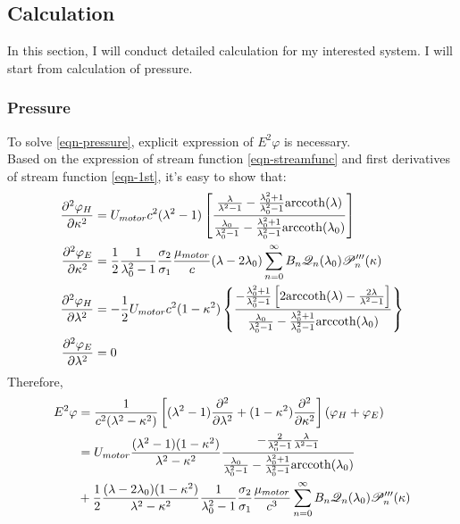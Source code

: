 \documentclass[fontsize=11pt, %
                             paper=a4, %
                             twoside, %
                             captions=tableheading,
                             index=totoc,
                             hyperref]{labbook}
\begin{document}
\begin{addmargin}[4cm]{0cm}
\subsection{Calculation}
In this section, I will conduct detailed calculation for my interested system. I will start from calculation of pressure.
\subsubsection{Pressure}
To solve \ref{eqn-pressure}, explicit expression of $E^2 \varphi$ is necessary.\\
Based on the expression of stream function \ref{eqn-streamfunc} and first derivatives of stream function \ref{eqn-1st}, it's easy to show that:
\begin{equation}
\begin{aligned}
\frac{\partial^2 \varphi_H}{\partial \kappa^2}&=U_{motor}c^2(\lambda^2-1)\left[\frac{\frac{\lambda}{\lambda^2-1}-\frac{\lambda_0^2+1}{\lambda^2_0-1}\mathrm{arccoth}(\lambda)}{\frac{\lambda_0}{\lambda_0^2-1}-\frac{\lambda_0^2+1}{\lambda_0^2-1}\mathrm{arccoth}(\lambda_0)}\right]\\
\frac{\partial^2 \varphi_E}{\partial \kappa^2}&=\frac{1}{2}\frac{1}{\lambda_0^2-1}\frac{\sigma_2}{\sigma_1}\frac{\mu_{motor}}{c}(\lambda-2\lambda_0)\sum_{n=0}^\infty B_n \mathscr{Q}_n(\lambda_0)\mathscr{P}_n^{\prime\prime\prime}(\kappa)\\
\frac{\partial^2 \varphi_H}{\partial \lambda^2}&=-\frac{1}{2}U_{motor}c^2(1-\kappa^2)\left\{\frac{-\frac{\lambda_0^2+1}{\lambda_0^2-1}\left[2\mathrm{arccoth}(\lambda)-\frac{2\lambda}{\lambda^2-1}\right]}{\frac{\lambda_0}{\lambda_0^2-1}-\frac{\lambda_0^2+1}{\lambda_0^2-1}\mathrm{arccoth}(\lambda_0)}\right\}\\
\frac{\partial^2 \varphi_E}{\partial \lambda^2}&=0
\end{aligned}
\end{equation}
Therefore,
\begin{equation}
\begin{aligned}
E^2\varphi&=\frac{1}{c^2(\lambda^2-\kappa^2)}\left[(\lambda^2-1)\pdd{}{\lambda}+(1-\kappa^2)\pdd{}{\kappa}\right]\left(\varphi_H+\varphi_E\right)\\
&=U_{motor}\frac{(\lambda^2-1)(1-\kappa^2)}{\lambda^2-\kappa^2}\frac{-\frac{2}{\lambda^2_0-1}\frac{\lambda}{\lambda^2-1}}{\frac{\lambda_0}{\lambda_0^2-1}-\frac{\lambda_0^2+1}{\lambda_0^2-1}\mathrm{arccoth}(\lambda_0)}\\
&+\frac{1}{2}\frac{(\lambda-2\lambda_0)(1-\kappa^2)}{\lambda^2-\kappa^2}\frac{1}{\lambda_0^2-1}\frac{\sigma_2}{\sigma_1}\frac{\mu_{motor}}{c^3}\sum_{n=0}^\infty B_n \mathscr{Q}_n(\lambda_0)\mathscr{P}_n^{\prime\prime\prime}(\kappa)

\end{aligned}
\end{equation}
\end{addmargin}
\end{document}
